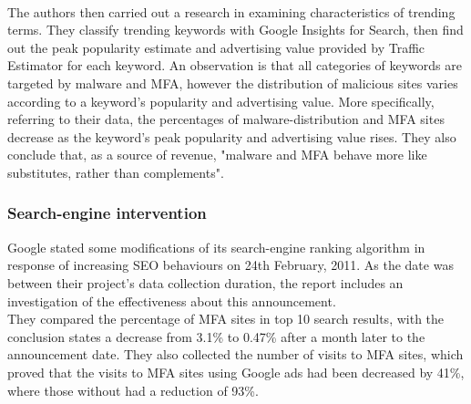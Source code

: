 \paragraph{}
The authors then carried out a research in examining characteristics of 
trending terms. They classify trending keywords with Google Insights for 
Search, then find out the peak popularity estimate and advertising value 
provided by Traffic Estimator for each keyword. An observation is that all 
categories of keywords are targeted by malware and MFA, however the 
distribution of malicious sites varies according to a keyword's popularity and 
advertising value. More specifically, referring to their data, the percentages 
of malware-distribution and MFA sites decrease as the keyword's peak 
popularity and advertising value rises. They also conclude that, as a source 
of revenue, "malware and MFA behave more like substitutes, rather than 
complements".\cite{fashioncrime}
\subsubsection{Search-engine intervention}
Google stated some modifications of its search-engine ranking algorithm in 
response of increasing SEO behaviours on 24th February, 2011. As the date was 
between their project's data collection duration, the report includes an 
investigation of the effectiveness about this announcement. \\
They compared the percentage of MFA sites in top 10 search results, with the 
conclusion states a decrease from 3.1\% to 0.47\% after a month later to the 
announcement date. They also collected the number of visits to MFA sites, 
which proved that the visits to MFA sites using Google ads had been decreased 
by 41\%, where those without had a reduction of 93\%. 
